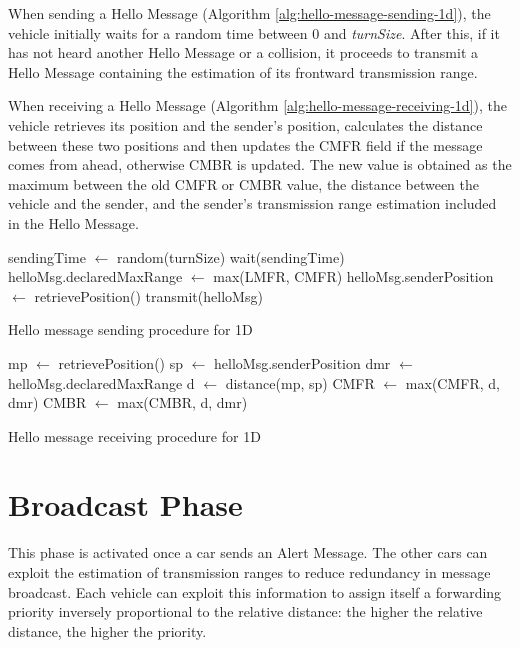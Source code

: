 		When sending a Hello Message (Algorithm \ref{alg:hello-message-sending-1d}), the vehicle initially waits for a random time between 0 and \textit{turnSize}. After this, if it has not heard another Hello Message or a collision, it proceeds to transmit a Hello Message containing the estimation of its frontward transmission range.
		
		
		When receiving a Hello Message (Algorithm \ref{alg:hello-message-receiving-1d}), the vehicle retrieves its position and the sender's position, calculates the distance between these two positions and then updates the CMFR field if the message comes from ahead, otherwise CMBR is updated. The new value is obtained as the maximum between the old CMFR or CMBR value, the distance between the vehicle and the sender, and the sender's transmission range estimation included in the Hello Message.
		
		\begin{algorithm}[H]
			\begin{algorithmic}[1]
					\State sendingTime $\gets$ random(turnSize)
					\State wait(sendingTime)
						\State helloMsg.declaredMaxRange $\gets$ max(LMFR, CMFR)
						\State helloMsg.senderPosition $\gets$ retrievePosition()
						\State transmit(helloMsg)
					\EndIf
				\EndFor
			\end{algorithmic}
			\caption{Hello message sending procedure for 1D}
			\label{alg:hello-message-sending-1d}
		\end{algorithm}
		
		\begin{algorithm}[H]
			\begin{algorithmic}[1]
				\State mp $\gets$ retrievePosition()
				\State sp $\gets$ helloMsg.senderPosition
				\State dmr $\gets$ helloMsg.declaredMaxRange
				\State d $\gets$ distance(mp, sp)
				\State CMFR $\gets$ max(CMFR, d, dmr)
				\Else
				\State CMBR $\gets$ max(CMBR, d, dmr)
				\EndIf
			\end{algorithmic}
			\caption{Hello message receiving procedure for 1D}
			\label{alg:hello-message-receiving-1d}
		\end{algorithm}
	
	\section{Broadcast Phase}
		This phase is activated once a car sends an Alert Message. The other cars can exploit the estimation of transmission ranges to reduce redundancy in message broadcast. Each vehicle can exploit this information to assign itself a forwarding priority inversely proportional to the relative distance: the higher the relative distance, the higher the priority.  
		
